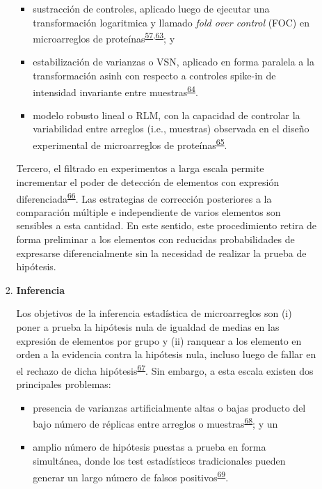 \documentclass[]{article}
\providecommand{\tightlist}{%
  \setlength{\itemsep}{0pt}\setlength{\parskip}{0pt}}
\begin{document}
\begin{enumerate}
\begin{enumerate}
\begin{enumerate}
      \begin{itemize}
      \tightlist
      \item
        sustracción de controles, aplicado luego de ejecutar una
        transformación logaritmica y llamado \emph{fold over control}
        (FOC) en microarreglos de
        proteínas\textsuperscript{\protect\hyperlink{ref-King2015FOC}{57},\protect\hyperlink{ref-arevalo2016}{63}};
        y
      \item
        estabilización de varianzas o VSN, aplicado en forma paralela a
        la transformación asinh con respecto a controles spike-in de
        intensidad invariante entre
        muestras\textsuperscript{\protect\hyperlink{ref-huber2002vsn}{64}}.
      \item
        modelo robusto lineal o RLM, con la capacidad de controlar la
        variabilidad entre arreglos (i.e., muestras) observada en el
        diseño experimental de microarreglos de
        proteínas\textsuperscript{\protect\hyperlink{ref-sboner2009rlm}{65}}.
      \end{itemize}

      Tercero, el filtrado en experimentos a larga escala permite
      incrementar el poder de detección de elementos con expresión
      diferenciada\textsuperscript{\protect\hyperlink{ref-bourgon2010filter}{66}}.
      Las estrategias de corrección posteriores a la comparación
      múltiple e independiente de varios elementos son sensibles a esta
      cantidad. En este sentido, este procedimiento retira de forma
      preliminar a los elementos con reducidas probabilidades de
      expresarse diferencialmente sin la necesidad de realizar la prueba
      de hipótesis.
    \item
      \textbf{Inferencia}

      Los objetivos de la inferencia estadística de microarreglos son
      (i) poner a prueba la hipótesis nula de igualdad de medias en las
      expresión de elementos por grupo y (ii) ranquear a los elemento en
      orden a la evidencia contra la hipótesis nula, incluso luego de
      fallar en el rechazo de dicha
      hipótesis\textsuperscript{\protect\hyperlink{ref-smyth2004ebayes}{67}}.
      Sin embargo, a esta escala existen dos principales problemas:

      \begin{itemize}
      \tightlist
      \item
        presencia de varianzas artificialmente altas o bajas producto
        del bajo número de réplicas entre arreglos o
        muestras\textsuperscript{\protect\hyperlink{ref-baldi2001cybert}{68}};
        y un
      \item
        amplio número de hipótesis puestas a prueba en forma simultánea,
        donde los test estadísticos tradicionales pueden generar un
        largo número de falsos
        positivos\textsuperscript{\protect\hyperlink{ref-kayala2012cyber}{69}}.
      \end{itemize}


\end{enumerate}
\end{enumerate}
\end{enumerate}
\end{document}
